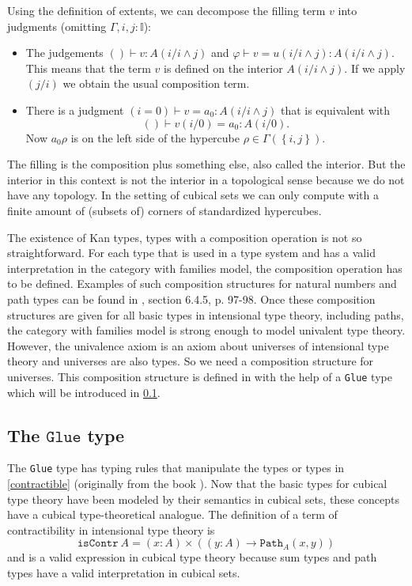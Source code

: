 \documentclass[12pt,a4paper,twoside,xetex,draft]{book}
\newcommand{\op}[1]{\mathtt{#1}}
\newcommand{\pa}[3]{\op{Path}_{#1}\left(#2, #3\right)}
\begin{document}
Using the definition of extents, we can decompose the filling term $v$ into judgments (omitting $\Gamma, i,j : \mathbb{I}$):

\begin{itemize}

\item The judgements $()\vdash v : A(i/i \wedge j)$ and $\varphi \vdash v = u(i/i \wedge j) : A(i/i \wedge j)$. 
This means that the term $v$ is defined on the interior $A(i/i \wedge j)$. 
If we apply $(j/i)$ we obtain the usual composition term.

\item There is a judgment $(i = 0) \vdash v = a_0 : A(i/i \wedge j)$ that is equivalent with $$() \vdash v(i/0) = a_0 : A(i/0).$$
Now $a_0\rho$ is on the left side of the hypercube $\rho \in \Gamma \left( \left\{i,j\right\} \right)$.

\end{itemize}

The filling is the composition plus something else, also called the interior. But the interior in this context is not the interior in a topological sense because we do not have any topology. In the setting of cubical sets we can only compute with a finite amount of (subsets of) corners of standardized hypercubes.

The existence of Kan types, types with a composition operation is not so straightforward. For each type that is used in a type system and has a valid interpretation in the category with families model, the composition operation has to be defined. Examples of such composition structures for natural numbers and path types can be found in \cite{Huber2016}, section 6.4.5, p. 97-98. Once these composition structures are given for all basic types in intensional type theory, including paths, the category with families model is strong enough to model univalent type theory. However, the univalence axiom is an axiom about universes of intensional type theory and universes are also types. So we need a composition structure for universes. This composition structure is defined in \cite{Huber2016} with the help of a \texttt{Glue} type which will be introduced in \cref{glueOp}. 



\subsection{The $\op{Glue}$ type}\label{glueOp}

The \texttt{Glue} type has typing rules that manipulate the types or types in \cref{contractible} (originally from the book \cite{Voevodsky2013}). Now that the basic types for cubical type theory have been modeled by their semantics in cubical sets, these concepts  have a cubical type-theoretical analogue. The definition of a term of contractibility in intensional type theory is $$\op{isContr} \ A = (x:A) \times \left( (y:A) \rightarrow \pa{A}{x}{y} \right)$$ and is a valid expression in cubical type theory because sum types and path types have a valid interpretation in cubical sets.
\end{document}

